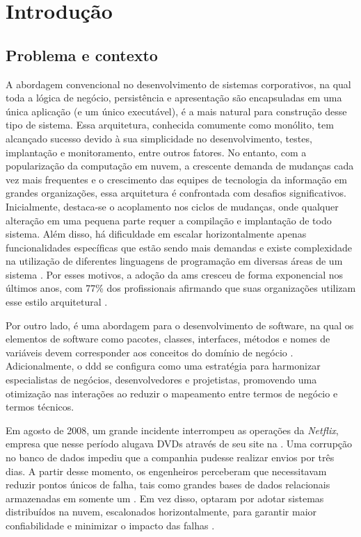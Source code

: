 \chapter{Introdução}
\label{cap:introducao}

\section{Problema e contexto}

A abordagem convencional no desenvolvimento de sistemas corporativos, na qual toda a lógica de negócio, persistência e apresentação são encapsuladas em uma única aplicação (e um único executável), é a mais natural para construção desse tipo de sistema. Essa arquitetura, conhecida comumente como monólito, tem alcançado sucesso devido à sua simplicidade no desenvolvimento, testes, implantação e monitoramento, entre outros fatores. No entanto, com a popularização da computação em nuvem, a crescente demanda de mudanças cada vez mais frequentes e o crescimento das equipes de tecnologia da informação em grandes organizações, essa arquitetura é confrontada com desafios significativos. Inicialmente, destaca-se o acoplamento nos ciclos de mudanças, onde qualquer alteração em uma pequena parte requer a compilação e implantação de todo sistema. Além disso, há dificuldade em escalar horizontalmente apenas funcionalidades específicas que estão sendo mais demandas e existe complexidade na utilização de diferentes linguagens de programação em diversas áreas de um sistema \cite{microservices}. Por esses motivos, a adoção da \acrfull{ams} cresceu de forma exponencial nos últimos anos, com 77\% dos profissionais afirmando que suas organizações utilizam esse estilo arquitetural \cite{microserviceAdoption}.

Por outro lado,  é uma abordagem para o desenvolvimento de software, na qual os elementos de software como pacotes, classes, interfaces, métodos e nomes de variáveis devem corresponder aos conceitos do domínio de negócio \cite{dddFowler}. Adicionalmente, o \acrshort{ddd} se configura como uma estratégia para harmonizar especialistas de negócios, desenvolvedores e projetistas, promovendo uma otimização nas interações ao reduzir o mapeamento entre termos de negócio e termos técnicos.

Em agosto de 2008, um grande incidente interrompeu as operações da \emph{Netflix}, empresa que nesse período alugava DVDs através de seu site na . Uma corrupção no banco de dados impediu que a companhia pudesse realizar envios por três dias. A partir desse momento, os engenheiros perceberam que necessitavam reduzir pontos únicos de falha, tais como grandes bases de dados relacionais armazenadas em somente um . Em vez disso, optaram por adotar sistemas distribuídos na nuvem, escalonados horizontalmente, para garantir maior confiabilidade e minimizar o impacto das falhas \cite{netflixMigration}.

